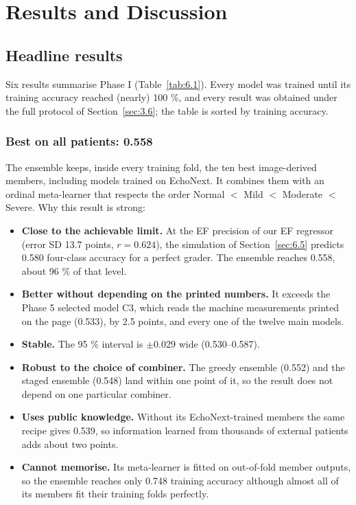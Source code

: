 \chapter{Results and Discussion}\label{ch:6}

\section{Headline results}\label{sec:6.1}



Six results summarise Phase I (Table~\ref{tab:6.1}). Every model was trained until its training accuracy reached (nearly) 100 \%, and every result was obtained under the full protocol of Section~\ref{sec:3.6}; the table is sorted by training accuracy.

\subsection{Best on all patients: 0.558}\label{sec:6.1.1}

The ensemble keeps, inside every training fold, the ten best image-derived members, including models trained on EchoNext. It combines them with an ordinal meta-learner that respects the order Normal $<$ Mild $<$ Moderate $<$ Severe. Why this result is strong:

\begin{itemize}
  \item \textbf{Close to the achievable limit.} At the EF precision of our EF regressor (error SD 13.7 points, $r=0.624$), the simulation of Section~\ref{sec:6.5} predicts 0.580 four-class accuracy for a perfect grader. The ensemble reaches 0.558, about 96 \% of that level.
  \item \textbf{Better without depending on the printed numbers.} It exceeds the Phase 5 selected model C3, which reads the machine measurements printed on the page (0.533), by 2.5 points, and every one of the twelve main models.
  \item \textbf{Stable.} The 95 \% interval is $\pm$0.029 wide (0.530--0.587).
  \item \textbf{Robust to the choice of combiner.} The greedy ensemble (0.552) and the staged ensemble (0.548) land within one point of it, so the result does not depend on one particular combiner.
  \item \textbf{Uses public knowledge.} Without its EchoNext-trained members the same recipe gives 0.539, so information learned from thousands of external patients adds about two points.
  \item \textbf{Cannot memorise.} Its meta-learner is fitted on out-of-fold member outputs, so the ensemble reaches only 0.748 training accuracy although almost all of its members fit their training folds perfectly.
\end{itemize}
